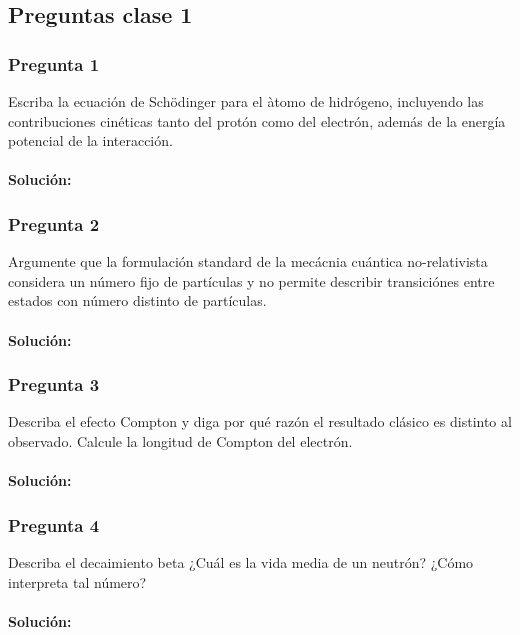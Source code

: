 \documentclass[../main_ej.tex]{subfiles}
\begin{document}
\subsection{Preguntas clase 1}
\subsubsection{Pregunta 1}
Escriba la ecuación de Schödinger para el àtomo de hidrógeno, incluyendo las contribuciones cinéticas tanto del protón como del electrón, además de la energía potencial de la interacción.
\\
\\
\textbf{Solución:}
\subsubsection{Pregunta 2}
Argumente que la formulación standard de la mecácnia cuántica no-relativista considera un número fijo de partículas y no permite describir transiciónes entre estados con número distinto de partículas. \\
\\
\textbf{Solución:}
\subsubsection{Pregunta 3}
Describa el efecto Compton y diga por qué razón el resultado clásico es distinto al observado. Calcule la longitud de Compton del electrón. \\
\\
\textbf{Solución:}
\subsubsection{Pregunta 4}
Describa el decaimiento beta ¿Cuál es la vida media de un neutrón? ¿Cómo interpreta tal número? \\
\\
\textbf{Solución:}
\end{document}
